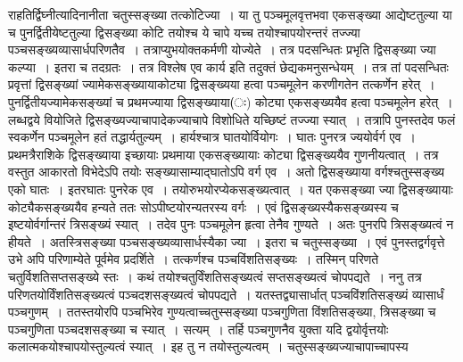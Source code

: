 \documentclass[11pt, openany]{book}
\begin{document}
\noindent राहतिर्द्विघ्नीत्यादिनानीता चतुस्सङ्ख्या तत्कोटिज्या~। या तु पञ्चमूलवृत्तभवा एकसङ्ख्या आद्येष्टतुल्या या च पुनर्द्वितीयेष्टतुल्या द्विसङ्ख्या कोटि तयोश्च ये चापे यच्च तयोश्चापयोरन्तरं तज्ज्या पञ्चसङ्ख्यव्यासार्धपरिणतैव~। तत्राप्युभयोक्तकर्मणी योज्येते~। तत्र पदसन्धितः प्रभृति द्विसङ्ख्या ज्या कल्प्या~। इतरा च तदग्रतः~। तत्र विश्लेष एव कार्य इति तदुक्तं छेद्यकमनुसन्धेयम्~। तत्र तां पदसन्धितः प्रवृत्तां द्विसङ्ख्यां
ज्यामेकसङ्ख्यायाकोट्या द्विसङ्ख्यया हत्वा पञ्चमूलेन करणीगतेन तत्कर्णेन हरेत्~। पुनर्द्वितीयज्यामेकसङ्ख्यां च प्रथमज्याया द्विसङ्ख्याया(ः) कोट्या एकसङ्ख्ययैव हत्वा पञ्चमूलेन हरेत्~। लब्धद्वये वियोजिते द्विसङ्ख्यज्याचापादेकज्याचापे विशोधिते यच्छिष्टं तज्ज्या स्यात्~। तत्रापि पुनस्तदेव फलं स्वकर्णेन पञ्चमूलेन हतं तद्धार्यतुल्यम्~। हार्यश्चात्र घातयोर्वियोगः~। घातः पुनरत्र ज्ययोर्वर्ग एव~। प्रथमत्रैराशिके द्विसङ्ख्याया इच्छायाः प्रथमाया एकसङ्ख्यायाः कोट्या द्विसङ्ख्ययैव गुणनीयत्वात्~। तत्र वस्तुत आकारतो विभेदेऽपि तयोः सङ्ख्यासाम्याद्घातोऽपि वर्ग एव~। अतो द्विसङ्ख्याया वर्गश्चतुस्सङ्ख्य एको घातः~। इतरघातः पुनरेक एव~। तयोरुभयोरप्येकसङ्ख्यत्वात्~। यत एकसङ्ख्या ज्या द्विसङ्ख्यायाः कोट्यैकसङ्ख्ययैव हन्यते ततः सोऽपीष्टयोरन्यतरस्य वर्गः~। एवं द्विसङ्ख्यस्यैकसङ्ख्यस्य च इष्टयोर्वर्गान्तरं त्रिसङ्ख्यं स्यात्~। तदेव पुनः पञ्चमूलेन हृत्वा तेनैव गुण्यते~। अतः पुनरपि त्रिसङ्ख्यत्वं न हीयते~। अतस्त्रिसङ्ख्या पञ्चसङ्ख्यव्यासार्धस्यैका ज्या~। इतरा च चतुस्सङ्ख्या~। एवं पुनस्तद्वर्गवृत्ते उभे अपि परिणाम्येते पूर्वमेव प्रदर्शिते~। तत्कर्णश्च पञ्चविंशतिसङ्ख्यः~। तस्मिन् परिणते चतुर्विशतिसप्तसङ्ख्ये स्तः~। कथं तयोश्चतुर्विंशतिसङ्ख्यत्वं सप्तसङ्ख्यत्वं चोपपद्यते~। ननु तत्र परिणतयोर्विंशतिसङ्ख्यत्वं पञ्चदशसङ्ख्यत्वं चोपपद्यते~। यतस्तद्व्यासार्धात् पञ्चविंशतिसङ्ख्यं व्यासार्धं पञ्चगुणम्~। ततस्तयोरपि पञ्चभिरेव गुण्यत्वाच्चतुस्सङ्ख्या पञ्चगुणिता विंशतिसङ्ख्या, त्रिसङ्ख्या च पञ्चगुणिता पञ्चदशसङ्ख्या च स्यात्~। सत्यम्~। तर्हि पञ्चगुणनैव युक्ता यदि द्वयोर्वृत्तयोः कलात्मकयोश्चापयोस्तुल्यत्वं स्यात्~। इह तु न तयोस्तुल्यत्वम्~। चतुस्सङ्ख्यज्याचापाच्चापस्य

\newpage
\end{document}
